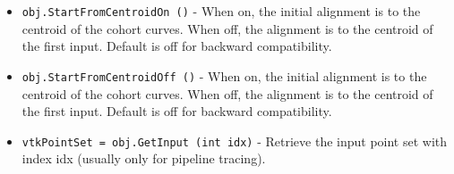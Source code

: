 \begin{itemize}
\item  \verb|obj.StartFromCentroidOn ()| -  When on, the initial alignment is to the centroid 
 of the cohort curves.  When off, the alignment is to the 
 centroid of the first input.  Default is off for
 backward compatibility.

\item  \verb|obj.StartFromCentroidOff ()| -  When on, the initial alignment is to the centroid 
 of the cohort curves.  When off, the alignment is to the 
 centroid of the first input.  Default is off for
 backward compatibility.

\item  \verb|vtkPointSet = obj.GetInput (int idx)| -  Retrieve the input point set with index idx (usually only for pipeline
 tracing).

\end{itemize}
